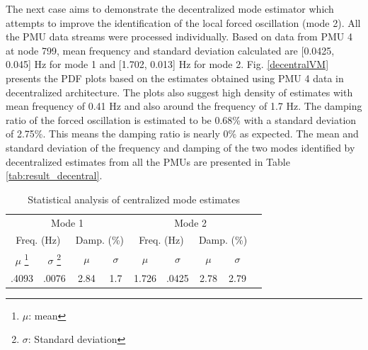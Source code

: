 \documentclass[conference]{IEEEtran}
\renewcommand\footnoterule{\vspace*{-3pt}%
     \hrule width 2in height 0.4pt
     \vspace*{2.6pt}}
\begin{document}
The next case aims to demonstrate the decentralized mode estimator which attempts to improve the identification of the local forced oscillation (mode 2). All the PMU data streams were processed individually. Based on data from PMU 4 at node 799, mean frequency and standard deviation calculated are [0.0425, 0.045] Hz for mode 1 and [1.702, 0.013] Hz for mode 2.  Fig. \ref{decentralVM} presents the PDF plots based on the estimates obtained using PMU 4 data in decentralized architecture. The plots also suggest high density of estimates with mean frequency of 0.41 Hz  and also around the frequency of 1.7 Hz. The damping ratio of the forced oscillation is estimated to be 0.68\% with a standard deviation of 2.75\%. This means the damping ratio is nearly 0\% as expected. The mean and standard deviation of the frequency and damping of the two modes identified by decentralized estimates from all the PMUs are presented in Table \ref{tab:result_decentral}.
\begin{table}[!h]
\vspace{-1em}
\renewcommand{\arraystretch}{1.2}
\caption{Statistical analysis of centralized mode estimates}
\label{tab:result_central}
\noindent
\centering
    \begin{minipage}{\linewidth} %
    \renewcommand\footnoterule{\vspace*{-5pt}} %
    \begin{center}
        \begin{tabular}{c c c c c c c c c}
            \toprule
             \multicolumn{4}{c}{Mode 1 }& \multicolumn{4}{c}{Mode 2}\\
            \cline{1-8}
             \multicolumn{2}{c}{Freq. (Hz)}& \multicolumn{2}{c}{Damp. (\%)} & \multicolumn{2}{c}{Freq. (Hz)}& \multicolumn{2}{c}{Damp. (\%)}\\
            \cline{1-8}
             $\mu $ \footnote{$\mu $: mean}& $\sigma $ \footnote{$\sigma $: Standard deviation}  & $\mu $ & $\sigma $ & $\mu $ & $\sigma $ & $\mu $ & $\sigma $\\
            \midrule
              .4093  & .0076 & 2.84 & 1.7 & 1.726 & .0425 & 2.78 & 2.79\\
            
            \bottomrule
        \end{tabular}
        \end{center}
    \end{minipage}
\end{table}
\end{document}
